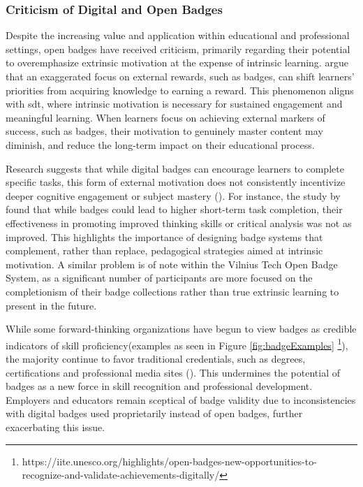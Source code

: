 \subsubsection{Criticism of Digital and Open Badges}
Despite the increasing value and application within educational and professional settings, open badges have received criticism, primarily regarding their potential to overemphasize extrinsic motivation at the expense of intrinsic learning. 
\textcite{risquez2020badge} argue that an exaggerated focus on external rewards, such as badges, can shift learners' priorities from acquiring knowledge to earning a reward. 
This phenomenon aligns with \textcite{sdt} \acrshort{sdt}, where intrinsic motivation is necessary for sustained engagement and meaningful learning. 
When learners focus on achieving external markers of success, such as badges, their motivation to genuinely master content may diminish, and reduce the long-term impact on their educational process.

Research suggests that while digital badges can encourage learners to complete specific tasks, this form of external motivation does not consistently incentivize deeper cognitive engagement or subject mastery (\cite{areBadgesUseful}). 
For instance, the study by \textcite{credentialsBadges} found that while badges could lead to higher short-term task completion, their effectiveness in promoting improved thinking skills or critical analysis was not as improved. 
This highlights the importance of designing badge systems that complement, rather than replace, pedagogical strategies aimed at intrinsic motivation. 
A similar problem is of note within the Vilnius Tech Open Badge System, as a significant number of participants are more focused on the completionism of their badge collections rather than true extrinsic learning to present in the future.

While some forward-thinking organizations have begun to view badges as credible indicators of skill proficiency(examples as seen in Figure \ref{fig:badgeExamples} \footnote{https://iite.unesco.org/highlights/open-badges-new-opportunities-to-recognize-and-validate-achievements-digitally/}), the majority continue to favor traditional credentials, such as degrees, certifications and professional media sites (\cite {credentialsBadges}). 
This undermines the potential of badges as a new force in skill recognition and professional development. 
Employers and educators remain sceptical of badge validity due to inconsistencies with digital badges used proprietarily instead of open badges, further exacerbating this issue.

